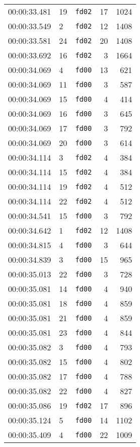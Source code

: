 \documentclass{article}
\begin{document}
\begin{longtable}{lllrr}
00:00:33.481 & 19 & \texttt{fd02} & 17 & 1024 \\
00:00:33.549 & 2 & \texttt{fd02} & 12 & 1408 \\
00:00:33.581 & 24 & \texttt{fd02} & 20 & 1408 \\
00:00:33.692 & 16 & \texttt{fd02} & 3 & 1664 \\
00:00:34.069 & 4 & \texttt{fd00} & 13 & 621 \\
00:00:34.069 & 11 & \texttt{fd00} & 3 & 587 \\
00:00:34.069 & 15 & \texttt{fd00} & 4 & 414 \\
00:00:34.069 & 16 & \texttt{fd00} & 3 & 645 \\
00:00:34.069 & 17 & \texttt{fd00} & 3 & 792 \\
00:00:34.069 & 20 & \texttt{fd00} & 3 & 614 \\
00:00:34.114 & 3 & \texttt{fd02} & 4 & 384 \\
00:00:34.114 & 15 & \texttt{fd02} & 4 & 384 \\
00:00:34.114 & 19 & \texttt{fd02} & 4 & 512 \\
00:00:34.114 & 22 & \texttt{fd02} & 4 & 512 \\
00:00:34.541 & 15 & \texttt{fd00} & 3 & 792 \\
00:00:34.642 & 1 & \texttt{fd02} & 12 & 1408 \\
00:00:34.815 & 4 & \texttt{fd00} & 3 & 644 \\
00:00:34.839 & 3 & \texttt{fd00} & 15 & 965 \\
00:00:35.013 & 22 & \texttt{fd00} & 3 & 728 \\
00:00:35.081 & 14 & \texttt{fd00} & 4 & 940 \\
00:00:35.081 & 18 & \texttt{fd00} & 4 & 859 \\
00:00:35.081 & 21 & \texttt{fd00} & 4 & 859 \\
00:00:35.081 & 23 & \texttt{fd00} & 4 & 844 \\
00:00:35.082 & 3 & \texttt{fd00} & 4 & 793 \\
00:00:35.082 & 15 & \texttt{fd00} & 4 & 802 \\
00:00:35.082 & 17 & \texttt{fd00} & 4 & 788 \\
00:00:35.082 & 22 & \texttt{fd00} & 4 & 827 \\
00:00:35.086 & 19 & \texttt{fd02} & 17 & 896 \\
00:00:35.124 & 5 & \texttt{fd00} & 14 & 1102 \\
00:00:35.409 & 4 & \texttt{fd00} & 22 & 1009 \\

\end{longtable}
\end{document}

